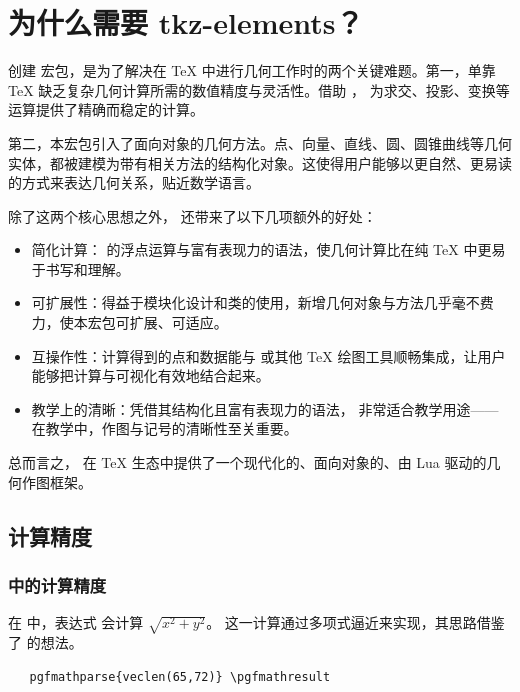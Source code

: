 \newpage
\section{为什么需要 tkz-elements？}

创建  宏包，是为了解决在 TeX 中进行几何工作时的两个关键难题。第一，单靠 TeX 缺乏复杂几何计算所需的数值精度与灵活性。借助 ， 为求交、投影、变换等运算提供了精确而稳定的计算。

第二，本宏包引入了面向对象的几何方法。点、向量、直线、圆、圆锥曲线等几何实体，都被建模为带有相关方法的结构化对象。这使得用户能够以更自然、更易读的方式来表达几何关系，贴近数学语言。

除了这两个核心思想之外， 还带来了以下几项额外的好处：

\begin{itemize}

 \item 简化计算： 的浮点运算与富有表现力的语法，使几何计算比在纯 TeX 中更易于书写和理解。

\item  可扩展性：得益于模块化设计和类的使用，新增几何对象与方法几乎毫不费力，使本宏包可扩展、可适应。

\item  互操作性：计算得到的点和数据能与 \TIKZ{} 或其他 TeX 绘图工具顺畅集成，让用户能够把计算与可视化有效地结合起来。

 \item 教学上的清晰：凭借其结构化且富有表现力的语法， 非常适合教学用途——在教学中，作图与记号的清晰性至关重要。
\end{itemize}

总而言之， 在 TeX 生态中提供了一个现代化的、面向对象的、由 Lua 驱动的几何作图框架。

\subsection{计算精度}
\subsubsection{\TIKZ{} 中的计算精度}
在 \TIKZ{} 中，表达式  会计算 $\sqrt{x^2+y^2}$。
这一计算通过多项式逼近来实现，其思路借鉴了  的想法。

 
\begin{mybox}{}
\begin{verbatim}
   pgfmathparse{veclen(65,72)} \pgfmathresult
\end{verbatim}
\end{mybox}

